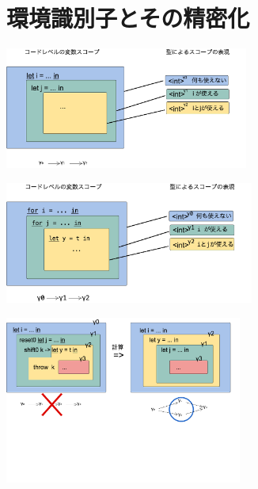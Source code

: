 
\section{環境識別子とその精密化}


\begin{center}
  \includegraphics[clip,height=4cm]{./img/ec_let.png}
\end{center}

\begin{center}
  \includegraphics[clip,height=4cm]{./img/ec_for.png}
\end{center}



\begin{center}
  \includegraphics[clip,height=5.5cm]{./img/ecex_let.png}
\end{center}

